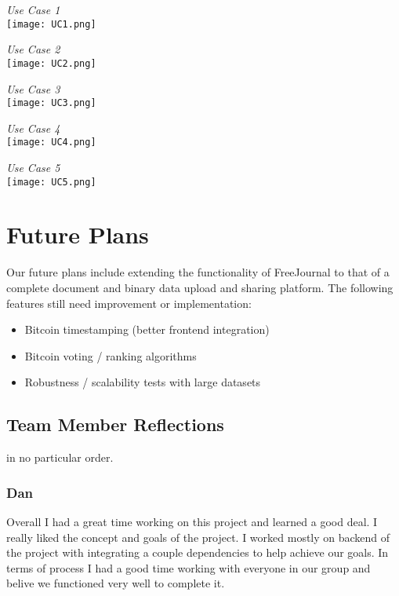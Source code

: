 \documentclass[letterpaper,10pt,oneside]{sphinxmanual}
\begin{document}
\emph{Use Case 1} \\
\label{architecture:use-case-1}
\texttt{[image: UC1.png]}


\emph{Use Case 2} \\
\label{architecture:use-case-2}
\texttt{[image: UC2.png]}


\emph{Use Case 3} \\
\label{architecture:use-case-3}
\texttt{[image: UC3.png]}


\emph{Use Case 4} \\
\label{architecture:use-case-4}
\texttt{[image: UC4.png]}


\emph{Use Case 5} \\
\label{architecture:use-case-5}
\texttt{[image: UC5.png]}

\chapter{Future Plans}
\label{future:future-plans}\label{future::doc}
Our future plans include extending the functionality of FreeJournal to that of a complete
document and binary data upload and sharing platform.  The following features still need
improvement or implementation:
\begin{itemize}
\item {} 
Bitcoin timestamping (better frontend integration)

\item {} 
Bitcoin voting / ranking algorithms

\item {} 
Robustness / scalability tests with large datasets

\end{itemize}


\section{Team Member Reflections}
\label{future:team-member-reflections}
in no particular order.


\subsection{Dan}
\label{future:dan}
Overall I had a great time working on this project and learned a good deal. I really liked the concept and
goals of the project. I worked mostly on backend of the project with integrating a couple dependencies to help
achieve our goals. In terms of process I had a good time working with everyone in our group and belive we
functioned very well to complete it.
\end{document}
